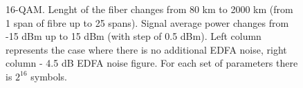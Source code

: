 \begin{figure}[htpb]
    \begin{minipage}[h]{0.5\linewidth}
    \end{minipage}
    \hfill
    \begin{minipage}[h]{0.5\linewidth}
    \end{minipage}
    \caption{16-QAM. Lenght of the fiber changes from 80 km to 2000 km (from 1 span of fibre up to 25 spans). Signal average power changes from -15 dBm up to 15 dBm (with step of 0.5 dBm). Left column represents the case where there is no additional EDFA noise, right column - 4.5 dB EDFA noise figure. For each set of parameters there is $2^{16}$ symbols.}
    \label{fig:hpcom_example1}
\end{figure}


